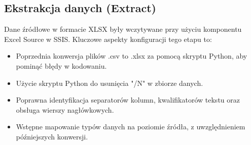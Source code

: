 \documentclass[a4paper,12pt]{article}
\begin{document}
\subsection{Ekstrakcja danych (Extract)}
Dane źródłowe w formacie XLSX były wczytywane przy użyciu komponentu Excel Source w SSIS. Kluczowe aspekty konfiguracji tego etapu to:
\begin{itemize}
  \item Poprzednia konwersja plików .csv to .xlsx za pomocą skryptu Python, aby pominąć błędy w kodowaniu.
  \item Użycie skryptu Python do usunięcia "/N" w zbiorze danych.
  \item Poprawna identyfikacja separatorów kolumn, kwalifikatorów tekstu oraz obsługa wierszy nagłówkowych.
  \item Wstępne mapowanie typów danych na poziomie źródła, z uwzględnieniem późniejszych konwersji.
\end{itemize}
\end{document}

